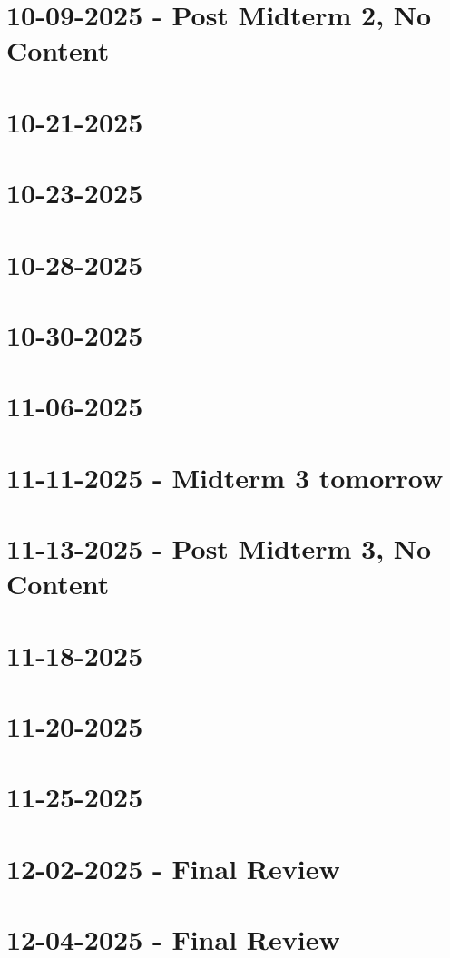 \documentclass[]{mangos-musings}
\begin{document}
\newpage
\section{10-09-2025 - Post Midterm 2, No Content}

\newpage
\section{10-21-2025}

\newpage
\section{10-23-2025}

\newpage
\section{10-28-2025}

\newpage
\section{10-30-2025}

\newpage
\section{11-06-2025}

\newpage
\section{11-11-2025 - Midterm 3 tomorrow}

\newpage
\section{11-13-2025 - Post Midterm 3, No Content}

\newpage
\section{11-18-2025}

\newpage
\section{11-20-2025}

\newpage
\section{11-25-2025}

\newpage
\section{12-02-2025 - Final Review}

\newpage
\section{12-04-2025 - Final Review}
\end{document}
